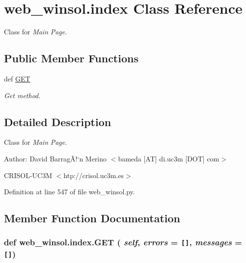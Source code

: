 \hypertarget{classweb__winsol_1_1index}{
\section{web\_\-winsol.index Class Reference}
\label{classweb__winsol_1_1index}
}
Class for {\em Main\/} {\em Page\/}.  


\subsection*{Public Member Functions}
\begin{CompactItemize}
\item 
def \hyperlink{classweb__winsol_1_1index_d118e5b894a10cc3e543fc8ba2682a49}{GET}
\begin{CompactList}\small\item\em Get method. \item\end{CompactList}\end{CompactItemize}


\subsection{Detailed Description}
Class for {\em Main\/} {\em Page\/}. 

\begin{Desc}
\item[Author:]David Barrag\~{A}!`n Merino $<$bameda \mbox{[}AT\mbox{]} di.uc3m \mbox{[}DOT\mbox{]} com$>$ 

CRISOL-UC3M $<$htp://crisol.uc3m.es$>$ \end{Desc}




Definition at line 547 of file web\_\-winsol.py.

\subsection{Member Function Documentation}
\hypertarget{classweb__winsol_1_1index_d118e5b894a10cc3e543fc8ba2682a49}{
\subsubsection[GET]{\setlength{\rightskip}{0pt plus 5cm}def web\_\-winsol.index.GET ( {\em self},  {\em errors} = {\tt \mbox{[}\mbox{]}},  {\em messages} = {\tt \mbox{[}\mbox{]}})}}
\label{classweb__winsol_1_1index_d118e5b894a10cc3e543fc8ba2682a49}



